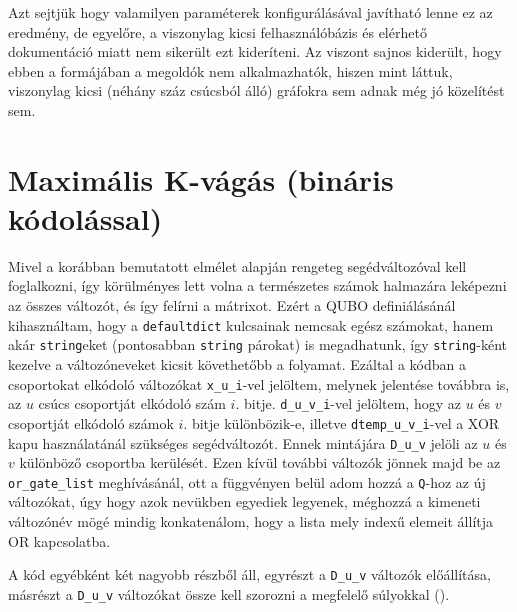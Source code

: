 Azt sejtjük hogy valamilyen paraméterek konfigurálásával javítható lenne ez az eredmény, de egyelőre, a viszonylag kicsi felhasználóbázis és elérhető dokumentáció miatt nem sikerült ezt kideríteni. Az viszont sajnos kiderült, hogy ebben a formájában a megoldók nem alkalmazhatók, hiszen mint láttuk, viszonylag kicsi (néhány száz csúcsból álló) gráfokra sem adnak még jó közelítést sem.

\section{Maximális K-vágás (bináris kódolással)}\label{sec:practiceBinary}

Mivel a korábban bemutatott elmélet alapján rengeteg segédváltozóval kell foglalkozni, így körülményes lett volna a természetes számok halmazára leképezni az összes változót, és így felírni a mátrixot. Ezért a QUBO definiálásánál kihasználtam, hogy a \verb+defaultdict+ kulcsainak nemcsak egész számokat, hanem akár \verb+string+eket (pontosabban \verb+string+ párokat) is megadhatunk, így \verb+string+-ként kezelve a változóneveket kicsit követhetőbb a folyamat. Ezáltal a kódban a csoportokat elkódoló változókat \verb+x_u_i+-vel jelöltem, melynek jelentése továbbra is, az $u$ csúcs csoportját elkódoló szám $i.$ bitje. \verb+d_u_v_i+-vel jelöltem, hogy az $u$ és $v$ csoportját elkódoló számok $i.$ bitje különbözik-e, illetve \verb+dtemp_u_v_i+-vel a XOR kapu használatánál szükséges segédváltozót. Ennek mintájára \verb+D_u_v+ jelöli az $u$ és $v$ különböző csoportba kerülését. Ezen kívül további változók jönnek majd be az \verb+or_gate_list+ meghívásánál, ott a függvényen belül adom hozzá a \verb+Q+-hoz az új változókat, úgy hogy azok nevükben egyediek legyenek, méghozzá a kimeneti változónév mögé mindig konkatenálom, hogy a lista mely indexű elemeit állítja OR kapcsolatba.

A kód egyébként két nagyobb részből áll, egyrészt a \verb+D_u_v+ változók előállítása, másrészt a  \verb+D_u_v+ változókat össze kell szorozni a megfelelő súlyokkal ().

